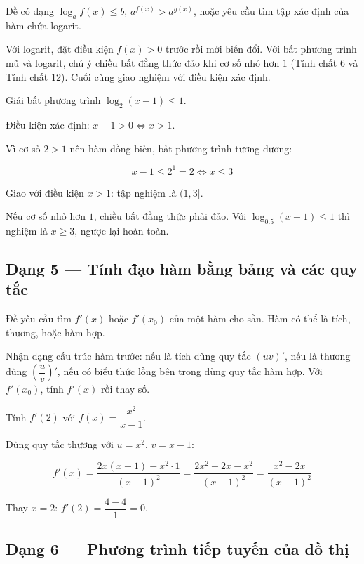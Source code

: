 \documentclass[11pt, a4paper]{article}
\begin{document}
 Đề có dạng $\log_a f(x) \le b$, $a^{f(x)} > a^{g(x)}$, hoặc yêu cầu tìm tập xác định của hàm chứa logarit.

 Với logarit, đặt điều kiện $f(x) > 0$ trước rồi mới biến đổi. Với bất phương trình mũ và logarit, chú ý chiều bất đẳng thức đảo khi cơ số nhỏ hơn $1$ (Tính chất 6 và Tính chất 12). Cuối cùng giao nghiệm với điều kiện xác định.

\begin{vidu}[{4}]
Giải bất phương trình $\log_2(x - 1) \le 1$.

Điều kiện xác định: $x - 1 > 0 \iff x > 1$.

Vì cơ số $2 > 1$ nên hàm đồng biến, bất phương trình tương đương:

$$x - 1 \le 2^1 = 2 \iff x \le 3$$

Giao với điều kiện $x > 1$: tập nghiệm là $(1, 3]$.

 Nếu cơ số nhỏ hơn $1$, chiều bất đẳng thức phải đảo. Với $\log_{0.5}(x-1) \le 1$ thì nghiệm là $x \ge 3$, ngược lại hoàn toàn.

\end{vidu}
\subsection{Dạng 5 — Tính đạo hàm bằng bảng và các quy tắc}

 Đề yêu cầu tìm $f'(x)$ hoặc $f'(x_0)$ của một hàm cho sẵn. Hàm có thể là tích, thương, hoặc hàm hợp.

 Nhận dạng cấu trúc hàm trước: nếu là tích dùng quy tắc $(uv)'$, nếu là thương dùng $\left(\dfrac{u}{v}\right)'$, nếu có biểu thức lồng bên trong dùng quy tắc hàm hợp. Với $f'(x_0)$, tính $f'(x)$ rồi thay số.

\begin{vidu}[{5}]
Tính $f'(2)$ với $f(x) = \dfrac{x^2}{x - 1}$.

Dùng quy tắc thương với $u = x^2$, $v = x - 1$:

$$f'(x) = \frac{2x(x-1) - x^2 \cdot 1}{(x-1)^2} = \frac{2x^2 - 2x - x^2}{(x-1)^2} = \frac{x^2 - 2x}{(x-1)^2}$$

Thay $x = 2$: $f'(2) = \dfrac{4 - 4}{1} = 0$.

\end{vidu}
\subsection{Dạng 6 — Phương trình tiếp tuyến của đồ thị}
\end{document}

